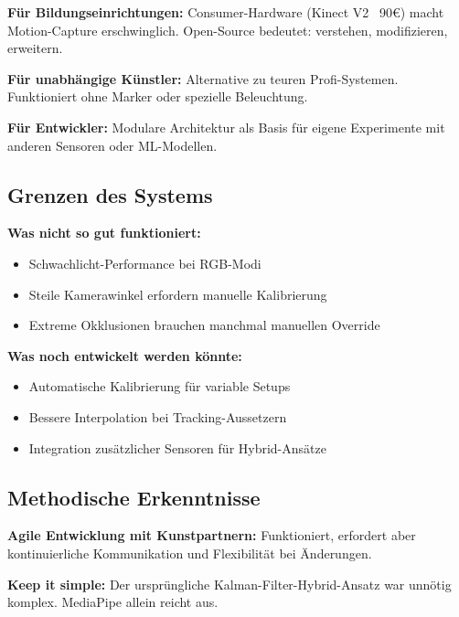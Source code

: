 \textbf{Für Bildungseinrichtungen:}
Consumer-Hardware (Kinect V2 ~90€) macht Motion-Capture erschwinglich. Open-Source bedeutet: verstehen, modifizieren, erweitern.

\textbf{Für unabhängige Künstler:}
Alternative zu teuren Profi-Systemen. Funktioniert ohne Marker oder spezielle Beleuchtung.

\textbf{Für Entwickler:}
Modulare Architektur als Basis für eigene Experimente mit anderen Sensoren oder ML-Modellen.

\subsection{Grenzen des Systems}

\textbf{Was nicht so gut funktioniert:}
\begin{itemize}
    \item Schwachlicht-Performance bei RGB-Modi
    \item Steile Kamerawinkel erfordern manuelle Kalibrierung
    \item Extreme Okklusionen brauchen manchmal manuellen Override
\end{itemize}

\textbf{Was noch entwickelt werden könnte:}
\begin{itemize}
    \item Automatische Kalibrierung für variable Setups
    \item Bessere Interpolation bei Tracking-Aussetzern
    \item Integration zusätzlicher Sensoren für Hybrid-Ansätze
\end{itemize}

\subsection{Methodische Erkenntnisse}

\textbf{Agile Entwicklung mit Kunstpartnern:} Funktioniert, erfordert aber kontinuierliche Kommunikation und Flexibilität bei Änderungen.

\textbf{Keep it simple:} Der ursprüngliche Kalman-Filter-Hybrid-Ansatz war unnötig komplex. MediaPipe allein reicht aus.